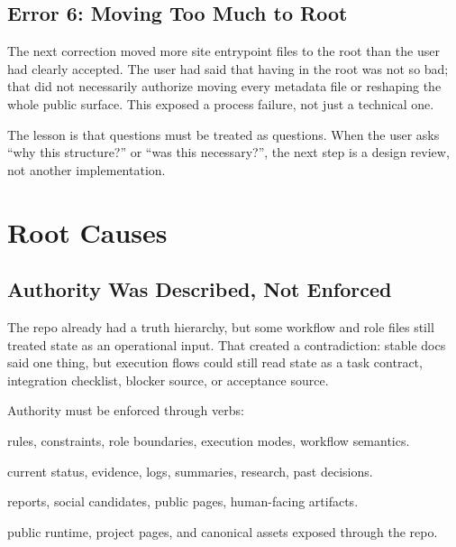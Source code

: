 \documentclass[a4paper,11pt,openany]{report}
\newcommand{\safePath}[1]{\texttt{\detokenize{#1}}}
\begin{document}
\section{Error 6: Moving Too Much to Root}

The next correction moved more site entrypoint files to the root than the user
had clearly accepted. The user had said that having \safePath{index.html} in the
root was not so bad; that did not necessarily authorize moving every metadata
file or reshaping the whole public surface. This exposed a process failure, not
just a technical one.

The lesson is that questions must be treated as questions. When the user asks
``why this structure?'' or ``was this necessary?'', the next step is a design
review, not another implementation.


\chapter{Root Causes}
\label{ch:root-causes}


\section{Authority Was Described, Not Enforced}

The repo already had a truth hierarchy, but some workflow and role files still
treated state as an operational input. That created a contradiction: stable docs
said one thing, but execution flows could still read state as a task contract,
integration checklist, blocker source, or acceptance source.

Authority must be enforced through verbs:

\begin{description}[style=nextline]
  \item[Docs define]
    rules, constraints, role boundaries, execution modes, workflow semantics.

  \item[State records]
    current status, evidence, logs, summaries, research, past decisions.

  \item[Content publishes]
    reports, social candidates, public pages, human-facing artifacts.

  \item[Site serves]
    public runtime, project pages, and canonical assets exposed through the repo.
\end{description}
\end{document}
